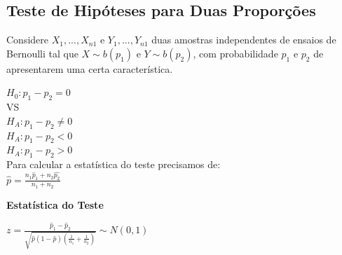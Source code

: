 \documentclass[a4paper, 12pt]{article}
\begin{document}
\subsection{Teste de Hipóteses para Duas Proporções}
	Considere $X_1, ..., X_{n1}$ e $Y_1, ..., Y_{n1}$ duas amostras independentes de ensaios de Bernoulli tal que $X \sim b(p_1)$ e $Y \sim b(p_2)$, com probabilidade $p_1$ e $p_2$ de apresentarem uma certa característica.
	
		\begin{center}
			\Large
			
			$
			H_0: p_1 - p_2 = 0 
			$\\VS\\
			$
			H_A: p_1 - p_2 \neq 0 
			$\\
			$
			H_A: p_1 - p_2 < 0 
			$\\
			$
			H_A: p_1 - p_2 > 0 
			$\\
			
			Para calcular a estatística do teste precisamos de:\\
			$
			\hat{p} = \frac{n_1\hat{p}_1 + n_2\hat{p_2}}{n_1 + n_2}
			$
			
		\end{center} 
	\textbf{Estatística do Teste}
		\begin{center}
			\Large
			$
			z = \frac{\hat{p}_1 - \hat{p}_2}{\sqrt{\hat{p}(1-\hat{p})(\frac{1}{n_1}+\frac{1}{n_2})}}\sim N(0, 1)
			$
		\end{center}
		








	
\end{document}
